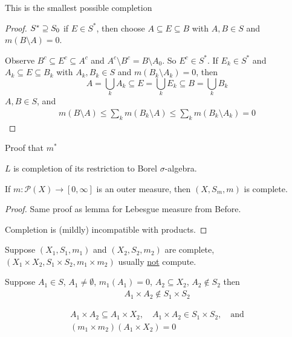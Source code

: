 \begin{remark}
	This is the smallest possible completion
\end{remark}

\begin{proof}
	$S^* \supseteq S_0$ if $E \in S^*$, then choose $A \subseteq E \subseteq B$ with $A,B \in S$ and  $m(B \setminus A) = 0$.

	Observe  $B^c \subseteq E^c \subseteq A^c$ and $A^c \setminus B^c = B \setminus A_0$. So
	 $E^c \in S^*$. If $E_k \in S^*$ and $A_k \subseteq E \subseteq B_k$ with $A_k, B_k \in S$ and $m(B_k \setminus A_k) = 0$,
	 then
	 \[
		 A = \bigcup_{k} A_k \subseteq
		 E = \bigcup_{k} E_k \subseteq
		 B = \bigcup_{k} B_k
	 \]
	 $A,B \in S$, and
	 \begin{align*}
		 m(B \setminus A) \leq \sum_{k} m(B_{k} \setminus A) \leq \sum_{k} m(B_{k} \setminus A_k) = 0
	 \end{align*}
\end{proof}

Proof that $m^*$

\begin{corollary}
	$L$ is completion of its restriction to Borel $\sigma$-algebra.
\end{corollary}

\begin{theorem}
	If $m : \mathcal{P}(X) \to [0,\infty]$ is an outer measure, then $(X,S_m, m)$ is complete.
\end{theorem}

\begin{proof}
	Same proof as lemma for Lebesgue measure from Before.

	Completion is (mildly) incompatible with products.
\end{proof}

\begin{example}
	Suppose $(X_1, S_1, m_1)$ and  $(X_2, S_2, m_2)$ are complete,
	$(X_1 \times X_2, S_1 \times S_2, m_1 \times m_2)$ usually \underline{not} compute.
\end{example}

Suppose $A_1 \in S$, $A_1 \neq \emptyset$,  $m_1(A_1) = 0$,  $A_2 \subseteq X_2$, $A_2 \notin S_2$
then
\begin{align*}
	A_1 \times A_2 \notin S_1 \times S_2
\end{align*}

\begin{align*}
	A_1 \times A_2 \subseteq A_1 \times X_2, \quad A_1 \times A_2 \in S_1 \times S_2, \quad \text{and} \\
	(m_1 \times m_2) (A_1 \times X_2) = 0
\end{align*}

